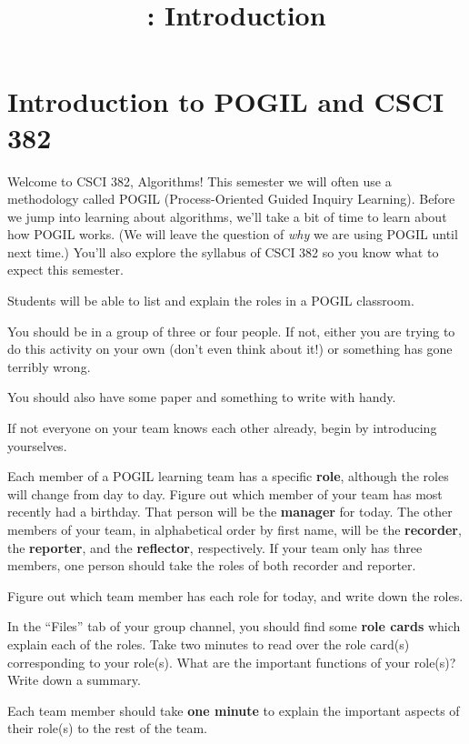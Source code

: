 \documentclass{tufte-handout}
\title{\thecourse: Introduction}
\date{}
\begin{document}
\maketitle

\section{Introduction to POGIL and CSCI 382}

Welcome to CSCI 382, Algorithms!  This semester we will often use a
methodology called POGIL (Process-Oriented Guided Inquiry
Learning). Before we jump into
learning about algorithms, we'll take a bit of time to learn about how
POGIL works. (We will leave the question of \emph{why} we are using
POGIL until next time.)  You'll also explore the syllabus of CSCI 382
so you know what to expect this semester.

\begin{objective}
  Students will be able to list and explain the roles in a POGIL
  classroom.
\end{objective}


You should be in a group of three or four people.  If not, either you
are trying to do this activity on your own (don't even think about
it!) or something has gone terribly wrong.

You should also have some paper and something to write with handy.

\begin{questions}
\item If not everyone on your team knows each other already, begin by
  introducing yourselves.
\end{questions}

Each member of a POGIL learning team has a specific \textbf{role},
although the roles will change from day to day.  Figure out which
member of your team has most recently had a birthday.  That person
will be the \textbf{manager} for today. The other members of your
team, in alphabetical order by first name, will be the
\textbf{recorder}, the \textbf{reporter}, and the \textbf{reflector},
respectively.  If your team only has three members, one person should
take the roles of both recorder and reporter.

\begin{questions}
\item Figure out which team member has each role for today, and write
  down the roles.
\item
  In the ``Files'' tab of your group channel, you should find some
  \textbf{role cards} which explain each of the roles.
  Take two minutes to read over the role card(s) corresponding to your
  role(s).  What are the important functions of your role(s)?  Write
  down a summary.
\item Each team member should take \textbf{one minute} to explain the
  important aspects of their role(s) to the rest of the team.
\end{questions}
\end{document}
